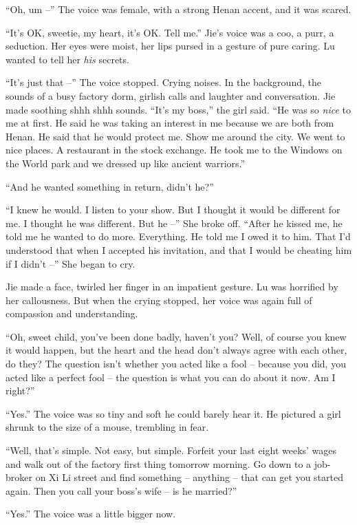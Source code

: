 ``Oh, um --'' The voice was female, with a strong Henan accent, and
it was scared.

``It's OK, sweetie, my heart, it's OK. Tell me.'' Jie's voice was a
coo, a purr, a seduction. Her eyes were moist, her lips pursed in a
gesture of pure caring. Lu wanted to tell her \emph{his} secrets.

``It's just that --'' The voice stopped. Crying noises. In the
background, the sounds of a busy factory dorm, girlish calls and
laughter and conversation. Jie made soothing shhh shhh sounds.
``It's my boss,'' the girl said. ``He was so \emph{nice} to me at
first. He said he was taking an interest in me because we are both
from Henan. He said that he would protect me. Show me around the
city. We went to nice places. A restaurant in the stock exchange.
He took me to the Windows on the World park and we dressed up like
ancient warriors.''

``And he wanted something in return, didn't he?''

``I knew he would. I listen to your show. But I thought it would be
different for me. I thought he was different. But he --'' She broke
off. ``After he kissed me, he told me he wanted to do more.
Everything. He told me I owed it to him. That I'd understood that
when I accepted his invitation, and that I would be cheating him if
I didn't --'' She began to cry.

Jie made a face, twirled her finger in an impatient gesture. Lu was
horrified by her callousness. But when the crying stopped, her
voice was again full of compassion and understanding.

``Oh, sweet child, you've been done badly, haven't you? Well, of
course you knew it would happen, but the heart and the head don't
always agree with each other, do they? The question isn't whether
you acted like a fool -- because you did, you acted like a perfect
fool -- the question is what you can do about it now. Am I right?''

``Yes.'' The voice was so tiny and soft he could barely hear it. He
pictured a girl shrunk to the size of a mouse, trembling in fear.

``Well, that's simple. Not easy, but simple. Forfeit your last eight
weeks' wages and walk out of the factory first thing tomorrow
morning. Go down to a job-broker on Xi Li street and find something
-- anything -- that can get you started again. Then you call your
boss's wife -- is he married?''

``Yes.'' The voice was a little bigger now.

